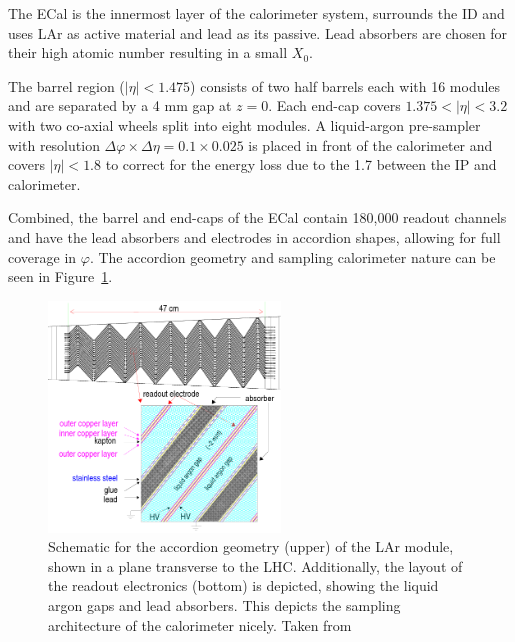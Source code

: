 
The ECal is the innermost layer of the calorimeter system, surrounds the ID and uses LAr as active material and lead as its passive. Lead absorbers are chosen for their high atomic number resulting in a small $X_0$. 

The barrel region ($|\eta| < 1.475$) consists of two half barrels each with 16 modules and are separated by a 4 mm gap at $z = 0$. Each end-cap covers $1.375 < |\eta| < 3.2$ with two co-axial wheels split into eight modules. A liquid-argon pre-sampler with resolution $\Delta\varphi \times \Delta\eta = 0.1 \times 0.025$ is placed in front of the calorimeter and covers $|\eta| < 1.8$ to correct for the energy loss due to the 1.7 \radlength{} between the IP and calorimeter. 

Combined, the barrel and end-caps of the ECal contain 180,000 readout channels and have the lead absorbers and electrodes in accordion shapes, allowing for full coverage in $\varphi$. The accordion geometry and sampling calorimeter nature can be seen in Figure~\ref{fig:atlas_calorimeter_accordion}. 

\begin{figure}[htp]
    \centering
    \includegraphics[width=0.55\textwidth]{figures/atlas/atlas_larg_module_accordion.png}
    \caption{Schematic for the accordion geometry (upper) of the LAr module, shown in a plane transverse to the LHC\@. Additionally, the layout of the readout electronics (bottom) is depicted, showing the liquid argon gaps and lead absorbers. This depicts the sampling architecture of the calorimeter nicely. Taken from~\cite{atlas_calorimeter_module_accordion}}\label{fig:atlas_calorimeter_accordion}
\end{figure}

